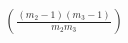 \documentclass[preview]{standalone}
\begin{document}
\begin{align*}
\left(\frac{(m_2 - 1)(m_3 - 1)}{m_2 m_3}\right)
\end{align*}
\end{document}
